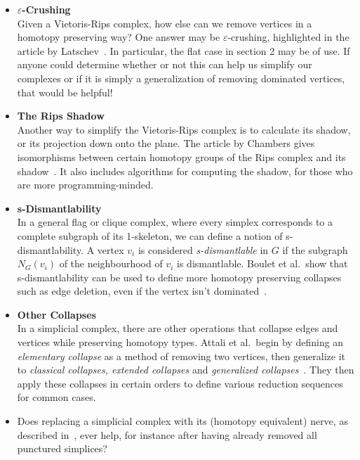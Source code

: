 \documentclass[amscd, amssymb, verbatim]{amsart}[12pt]
\theoremstyle{plain}
\theoremstyle{definition}
\begin{document}
\begin{itemize}
\item \textbf{$\varepsilon$-Crushing} \\
Given a Vietoris-Rips complex, how else can we remove vertices in a homotopy preserving way? One answer may be $\varepsilon$-crushing, highlighted in the article by Latschev~\cite{Latschev2001}.
In particular, the flat case in section 2 may be of use. 
If anyone could determine whether or not this can help us simplify our complexes or if it is simply a generalization of removing dominated vertices, that would be helpful!
\item \textbf{The Rips Shadow} \\
Another way to simplify the Vietoris-Rips complex is to calculate its shadow, or its projection down onto the plane.
The article by Chambers gives isomorphisms between certain homotopy groups of the Rips complex and its shadow~\cite{Chambers2008}. It also includes algorithms for computing the shadow, for those who are more programming-minded.

\item \textbf{s-Dismantlability} \\
In a general flag or clique complex, where every simplex corresponds to a complete subgraph of its 1-skeleton, we can define a notion of s-dismantlability.
A vertex $v_i$ is considered \textit{s-dismantlable} in $G$ if the subgraph $N_{G}(v_i)$ of the neighbourhood of $v_i$ is dismantlable.
Boulet et al.\ show that s-dismantlability can be used to define more homotopy preserving collapses such as edge deletion, even if the vertex isn't dominated~\cite{Boulet2010}.

\item \textbf{Other Collapses} \\
In a simplicial complex, there are other operations that collapse edges and vertices while preserving homotopy types. Attali et al.\ begin by defining an \textit{elementary collapse} as a method of removing two vertices, then generalize it to \textit{classical collapses, extended collapses} and \textit{generalized collapses}~\cite{Attali2013}.
They then apply these collapses in certain orders to define various reduction sequences for common cases.
\item Does replacing a simplicial complex with its (homotopy equivalent) nerve, as described in~\cite{barmak2012strong}, ever help, for instance after having already removed all punctured simplices?
\end{itemize}






\end{document}
